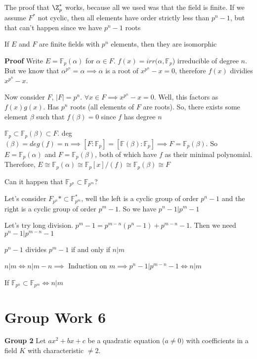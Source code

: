 \documentclass[10pt]{article}
\newcommand{\F}{\mathbb{F}}
\begin{document}
The proof that $\Z_p^*$ works, because all we used was that the field is finite. If we assume $F^*$ not cyclic, then all elements have order strictly less than $p^n - 1$, but that can't happen since we have $p^n - 1$ roots

\begin{thm}
    If $E$ and $F$ are finite fields with $p^n$ elements, then they are isomorphic
\end{thm}
\textbf{Proof} Write $E = \F_p(\alpha)$ for $\alpha \in F$. $f(x) = irr(\alpha, \F_p$) irreducible of degree $n$. But we know that $\alpha^{p^n} = \alpha \implies \alpha$ is a root of $x^{p^n} - x =  0$, therefore $f(x)$ dividies $x^{p^n} - x$. 

Now consider $F$, $|F| = p^n$. $\forall x \in F \implies x^{p^n} - x = 0$. Well, this factors as $f(x)g(x)$. Has $p^n$ roots (all elements of $F$ are roots). So, there exists some element $\beta$ such that $f(\beta) = 0$ since $f$ has degree $n$

$\F_p \subset \F_p(\beta) \subset F$. deg$(\beta) = deg(f) = n \implies [F: \F_p] = [\F(\beta) : \F_p] \implies F = \F_p(\beta)$. So $E = \F_p(\alpha)$ and $F = \F_p(\beta)$, both of which have $f$ as their minimal polynomial. Therefore, $E \cong \F_p(\alpha) \cong \F_p[x]/(f) \cong \F_p(\beta) \cong F$

\begin{rmk}
    Can it happen that $\F_{p^n} \subset \F_{p^m}$?
\end{rmk}
Let's consider $F_{p^n}* \subset \F_{p^m}^*$, well the left is a cyclic group of order $p^n - 1$ and the right is a cyclic group of order $p^m - 1$. So we have $p^n - 1|p^m - 1$

Let's try long division. $p^m - 1 = p^{m-n}(p^n - 1) + p^{m-n} - 1$. Then we need $p^n - 1 | p^{m-n} - 1$

\begin{thm}
    $p^n - 1$ divides $p^m - 1$ if and only if $n | m$
\end{thm}
$n | m \iff n | m - n \implies$ Induction on $m \implies p^n - 1 | p^{m-n} - 1 \iff n | m$
\begin{cor}
    If $\F_{p^n} \subset \F_{p^m} \iff n | m$
\end{cor}

\section{Group Work 6}
\textbf{Group 2}
Let $ax^2 + bx + c$ be a quadratic equation ($a \neq 0)$ with coefficients in a field $K$ with characteristic $\neq 2$. 
\end{document}
